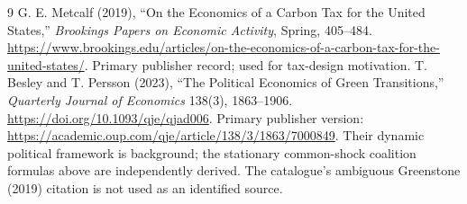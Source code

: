 \documentclass[11pt,a4paper]{article}
\theoremstyle{definition}
\theoremstyle{remark}
\begin{document}
\begin{thebibliography}{9}
 G. E. Metcalf (2019), ``On the Economics of a Carbon Tax for the United States,'' \emph{Brookings Papers on Economic Activity}, Spring, 405--484. \url{https://www.brookings.edu/articles/on-the-economics-of-a-carbon-tax-for-the-united-states/}. Primary publisher record; used for tax-design motivation.
 T. Besley and T. Persson (2023), ``The Political Economics of Green Transitions,'' \emph{Quarterly Journal of Economics} 138(3), 1863--1906. \url{https://doi.org/10.1093/qje/qjad006}. Primary publisher version: \url{https://academic.oup.com/qje/article/138/3/1863/7000849}. Their dynamic political framework is background; the stationary common-shock coalition formulas above are independently derived. The catalogue's ambiguous Greenstone (2019) citation is not used as an identified source.
\end{thebibliography}
\end{document}
